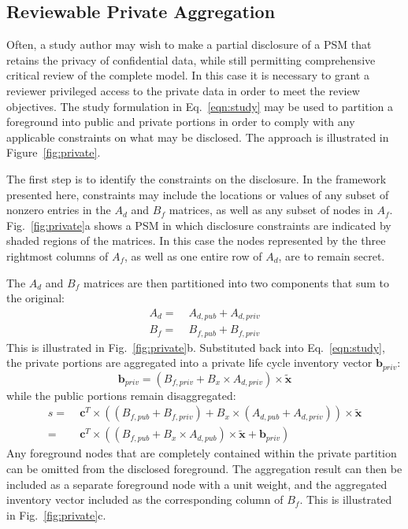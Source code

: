 \subsection{Reviewable Private Aggregation}



Often, a study author may wish to make a partial disclosure of a PSM that retains the privacy of confidential data, while still permitting comprehensive critical review of the complete model.  In this case it is necessary to grant a reviewer privileged access to the private data in order to meet the review objectives.  The study formulation in Eq.~\ref{eqn:study} may be used to partition a foreground into public and private portions in order to comply with any applicable constraints on what may be disclosed.  The approach is illustrated in Figure~\ref{fig:private}.

The first step is to identify the constraints on the disclosure.  In the framework presented here, constraints may include the locations or values of any subset of nonzero entries in the $A_d$ and $B_f$ matrices, as well as any subset of nodes in $A_f$.  Fig.~\ref{fig:private}a shows a PSM in which disclosure constraints are indicated by shaded regions of the matrices.  In this case the nodes represented by the three rightmost columns of $A_f$, as well as one entire row of $A_d$, are to remain secret.  

The $A_d$ and $B_f$ matrices are then partitioned into two components that sum to the original:
\begin{equation}\begin{aligned}
  A_d =\; & A_{d,pub} + A_{d,priv} \\
  B_f =\; & B_{f,pub} + B_{f,priv}
  \label{eqn:partition}
  \end{aligned}
  \end{equation}
This is illustrated in Fig.~\ref{fig:private}b.  Substituted back into Eq.~\ref{eqn:study}, the private portions are aggregated into a private life cycle inventory vector $\mathbf{b}_{priv}$:
\begin{equation}
  \mathbf{b}_{priv} = (B_{f,priv} + B_x\times A_{d,priv})\times \tilde{\mathbf{x}}
\end{equation}
while the public portions remain disaggregated:
\begin{align}
  s =\; & \mathbf{c}^T\times\left((B_{f,pub} + B_{f,priv}) + B_x\times (A_{d,pub} + A_{d,priv})\right)\times\tilde{\mathbf{x}}\\
  =\; & \mathbf{c}^T\times\left((B_{f,pub} + B_x\times A_{d,pub})\times\tilde{\mathbf{x}} + \mathbf{b}_{priv}\right)\label{eqn:private}
\end{align}
Any foreground nodes that are completely contained within the private partition can be omitted from the disclosed foreground.  The aggregation result can then be included as a separate foreground node with a unit weight, and the aggregated inventory vector included as the corresponding column of $B_f$.  This is illustrated in Fig.~\ref{fig:private}c.


